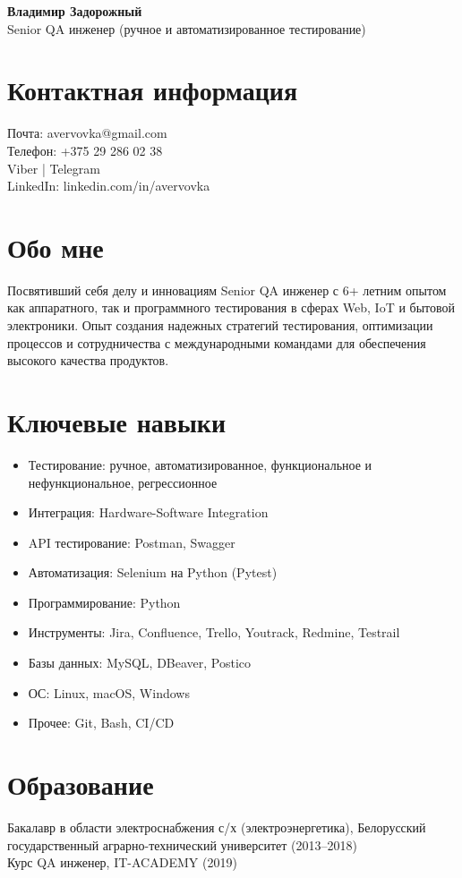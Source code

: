 \documentclass[11pt,a4paper]{article}
\begin{document}
\begin{center}
  {\Large \textbf{Владимир Задорожный}}\\[0.2cm]
  Senior QA инженер (ручное и автоматизированное тестирование)
\end{center}

\section*{Контактная информация}
Почта: avervovka@gmail.com \\
Телефон: +375 29 286 02 38 \\
Viber | Telegram \\
LinkedIn: linkedin.com/in/avervovka

\section*{Обо мне}
Посвятивший себя делу и инновациям Senior QA инженер с 6+ летним опытом как аппаратного, так и программного тестирования в сферах Web, IoT и бытовой электроники. Опыт создания надежных стратегий тестирования, оптимизации процессов и сотрудничества с международными командами для обеспечения высокого качества продуктов.

\section*{Ключевые навыки}
\begin{itemize}
  \item Тестирование: ручное, автоматизированное, функциональное и нефункциональное, регрессионное
  \item Интеграция: Hardware-Software Integration
  \item API тестирование: Postman, Swagger
  \item Автоматизация: Selenium на Python (Pytest)
  \item Программирование: Python
  \item Инструменты: Jira, Confluence, Trello, Youtrack, Redmine, Testrail
  \item Базы данных: MySQL, DBeaver, Postico
  \item ОС: Linux, macOS, Windows
  \item Прочее: Git, Bash, CI/CD
\end{itemize}

\section*{Образование}
Бакалавр в области электроснабжения с/х (электроэнергетика), Белорусский государственный аграрно-технический университет (2013--2018) \\
Курс QA инженер, IT-ACADEMY (2019)
\end{document}
